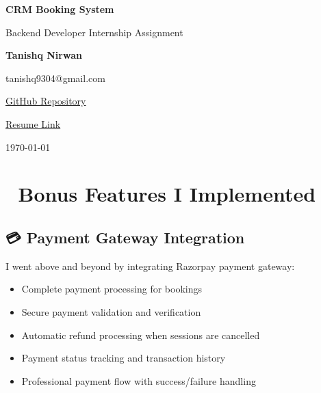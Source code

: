 \documentclass[12pt,a4paper]{article}
\begin{document}
\begin{titlepage}
    \centering
    \vspace*{2cm}
    
    {\Huge\bfseries CRM Booking System\par}
    \vspace{0.5cm}
    
    {\Large Backend Developer Internship Assignment\par}
    \vspace{2cm}
    
    {\Large\bfseries Tanishq Nirwan\par}
    \vspace{0.5cm}
    
    {\large tanishq9304@gmail.com\par}
    \vspace{1cm}
    
    {\large \href{https://github.com/tanishqnirwan/crm-booking}{GitHub Repository}\par}
    \vspace{0.5cm}
    
    {\large \href{https://drive.google.com/file/d/1QhD6NnthYqE78W8uKFYVCws6EeTQdxFs/view?usp=sharing}{Resume Link}\par}
    \vspace{2cm}
    
    {\large \today\par}
    
    \vfill
\end{titlepage}

\tableofcontents
\newpage

\section{🎉 Bonus Features I Implemented}

\subsection{💳 Payment Gateway Integration}
I went above and beyond by integrating Razorpay payment gateway:
\begin{itemize}
    \item Complete payment processing for bookings
    \item Secure payment validation and verification
    \item Automatic refund processing when sessions are cancelled
    \item Payment status tracking and transaction history
    \item Professional payment flow with success/failure handling
\end{itemize}
\end{document}
